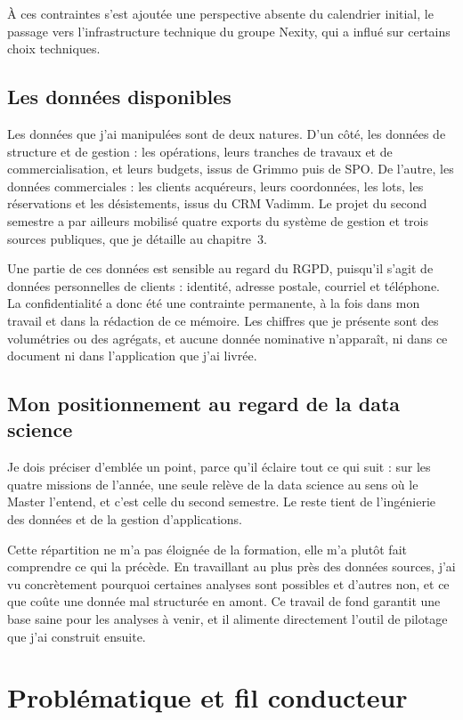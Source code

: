À ces contraintes s'est ajoutée une perspective absente du calendrier initial, le passage vers
l'infrastructure technique du groupe Nexity, qui a influé sur certains choix techniques.

\subsection{Les données disponibles}

Les données que j'ai manipulées sont de deux natures. D'un côté, les données de structure et de
gestion : les opérations, leurs tranches de travaux et de commercialisation, et leurs budgets,
issus de Grimmo puis de SPO. De l'autre, les données commerciales : les clients acquéreurs,
leurs coordonnées, les lots, les réservations et les désistements, issus du CRM Vadimm. Le
projet du second semestre a par ailleurs mobilisé quatre exports du système de gestion et trois
sources publiques, que je détaille au chapitre~3.

Une partie de ces données est sensible au regard du RGPD, puisqu'il s'agit de données
personnelles de clients : identité, adresse postale, courriel et téléphone. La confidentialité
a donc été une contrainte permanente, à la fois dans mon travail et dans la rédaction de ce
mémoire. Les chiffres que je présente sont des volumétries ou des agrégats, et aucune donnée
nominative n'apparaît, ni dans ce document ni dans l'application que j'ai livrée.

\subsection{Mon positionnement au regard de la data science}

Je dois préciser d'emblée un point, parce qu'il éclaire tout ce qui suit : sur les quatre
missions de l'année, une seule relève de la data science au sens où le Master l'entend, et
c'est celle du second semestre. Le reste tient de l'ingénierie des données et de la gestion
d'applications.

Cette répartition ne m'a pas éloignée de la formation, elle m'a plutôt fait comprendre ce qui
la précède. En travaillant au plus près des données sources, j'ai vu concrètement pourquoi
certaines analyses sont possibles et d'autres non, et ce que coûte une donnée mal structurée en
amont. Ce travail de fond garantit une base saine pour les analyses à venir, et il alimente
directement l'outil de pilotage que j'ai construit ensuite.

\section{Problématique et fil conducteur}

